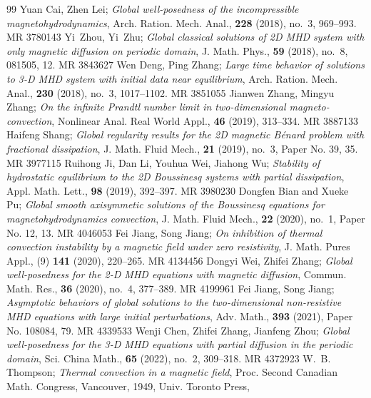 \documentclass[10pt,a4paper]{amsart}
\numberwithin{equation}{section}
\begin{document}
\begin{thebibliography}{99}
Yuan Cai, Zhen Lei; 
\emph{Global well-posedness of the incompressible
 magnetohydrodynamics}, Arch. Ration. Mech. Anal., \textbf{228} (2018), no.~3,
 969--993. MR {3780143}
Yi~Zhou, Yi~Zhu; 
\emph{Global classical solutions of 2{D} {MHD} system with
 only magnetic diffusion on periodic domain}, J. Math. Phys., \textbf{59}
 (2018), no.~8, 081505, 12. MR {3843627}
Wen Deng, Ping Zhang; 
\emph{Large time behavior of solutions to 3-{D} {MHD}
 system with initial data near equilibrium}, Arch. Ration. Mech. Anal.,
 \textbf{230} (2018), no.~3, 1017--1102. MR {3851055}
Jianwen Zhang, Mingyu Zhang; 
\emph{On the infinite {P}randtl number limit in
 two-dimensional magneto-convection}, Nonlinear Anal. Real World Appl.,
 \textbf{46} (2019), 313--334. MR {3887133}
Haifeng Shang; 
\emph{Global regularity results for the 2{D} magnetic
 {B}\'enard problem with fractional dissipation}, J. Math. Fluid Mech.,
 \textbf{21} (2019), no.~3, Paper No. 39, 35. MR {3977115}
Ruihong Ji, Dan Li, Youhua Wei,  Jiahong Wu; 
\emph{Stability of hydrostatic
 equilibrium to the 2{D} {B}oussinesq systems with partial dissipation}, Appl.
 Math. Lett., \textbf{98} (2019), 392--397. MR {3980230}
Dongfen Bian and Xueke Pu; 
\emph{Global smooth axisymmetic solutions of the
 {B}oussinesq equations for magnetohydrodynamics convection}, 
J. Math. Fluid  Mech., \textbf{22} (2020), no.~1, Paper No. 12, 13. MR {4046053}
Fei Jiang, Song Jiang; 
\emph{On inhibition of thermal convection instability
 by a magnetic field under zero resistivity}, J. Math. Pures Appl., (9)
 \textbf{141} (2020), 220--265. MR {4134456}
Dongyi Wei, Zhifei Zhang; 
\emph{Global well-posedness for the 2-{D} {MHD} equations with
 magnetic diffusion}, Commun. Math. Res., \textbf{36} (2020), no.~4, 377--389.
 MR {4199961}
Fei Jiang, Song Jiang; 
\emph{Asymptotic behaviors of global solutions to the two-dimensional
 non-resistive {MHD} equations with large initial perturbations}, Adv. Math.,
 \textbf{393} (2021), Paper No. 108084, 79. MR {4339533}
Wenji Chen, Zhifei Zhang, Jianfeng Zhou; 
\emph{Global well-posedness for
 the 3-{D} {MHD} equations with partial diffusion in the periodic domain},
 Sci. China Math., \textbf{65} (2022), no.~2, 309--318. MR {4372923}
W.~B. Thompson; 
\emph{Thermal convection in a magnetic field}, Proc. {S}econd
 {C}anadian {M}ath. {C}ongress, {V}ancouver, 1949, Univ. Toronto Press,

\end{thebibliography}
\end{document}
